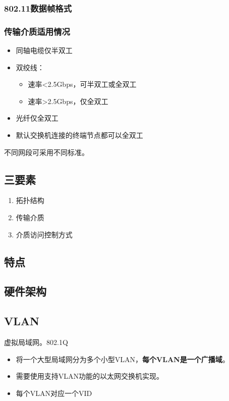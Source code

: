 \subsubsection{802.11数据帧格式}



\subsubsection{传输介质适用情况}
\begin{itemize}
    \item 同轴电缆仅半双工
    \item 双绞线：\begin{itemize}
        \item 速率<2.5Gbps，可半双工或全双工
        \item 速率>2.5Gbps，仅全双工
    \end{itemize}
    \item 光纤仅全双工
    \item 默认交换机连接的终端节点都可以全双工
\end{itemize}
不同网段可采用不同标准。


\subsection{三要素}
\begin{enumerate}
    \item 拓扑结构
    \item 传输介质
    \item 介质访问控制方式
\end{enumerate}


\subsection{特点}


\subsection{硬件架构}


\subsection{VLAN}
虚拟局域网。802.1Q
\begin{itemize}
    \item 将一个大型局域网分为多个小型VLAN，\textbf{每个VLAN是一个广播域}。
    \item 需要使用支持VLAN功能的以太网交换机实现。
    \item 每个VLAN对应一个VID
\end{itemize}

